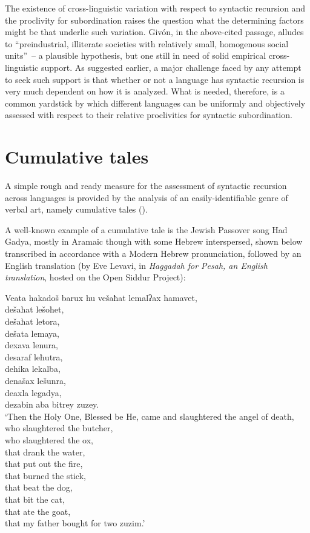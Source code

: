 \documentclass[output=paper]{langscibook}
\begin{document}
The existence of cross-linguistic variation with respect to syntactic recursion and the proclivity for subordination raises the question what the determining factors might be that underlie such variation.  Givón, in the above-cited passage, alludes to ``preindustrial, illiterate societies with relatively small, homogenous social units''~– a plausible hypothesis, but one still in need of solid empirical cross-linguistic support.  As suggested earlier, a major challenge faced by any attempt to seek such support is that whether or not a language has syntactic recursion is very much dependent on how it is analyzed.  What is needed, therefore, is a common yardstick by which different languages can be uniformly and objectively assessed with respect to their relative proclivities for syntactic subordination.

\section{Cumulative tales}
A simple rough and ready measure for the assessment of syntactic recursion across languages is provided by the analysis of an easily-identifiable genre of verbal art, namely cumulative tales (\cites[230--234]{thompson1946folktale}[522--536]{aarne1961types}).

A well-known example of a cumulative tale is the Jewish Passover song Had Gadya, mostly in Aramaic though with some Hebrew interspersed, shown below transcribed in accordance with a Modern Hebrew pronunciation, followed by an English translation (by Eve Levavi, in \textit{Haggadah for Pesah, an English translation}, hosted on the Open Siddur Project):

\ea \label{ex:gil:10}

Veata hakadoš barux hu vešaħat lemalʔax hamavet,\\	
 dešaħat lešoħet,\\
 dešaħat letora,\\
 dešata lemaya,\\
 dexava lenura,\\
 desaraf leħutra,\\
 dehika lekalba,\\
 denašax lešunra,\\
 deaxla legadya,\\
 dezabin aba bitrey zuzey.\\

 `Then the Holy One, Blessed be He, came and slaughtered the angel of death,\\
 who slaughtered the butcher,\\
 who slaughtered the ox, \\
 that drank the water, \\
 that put out the fire, \\
 that burned the stick, \\
 that beat the dog, \\
 that bit the cat, \\
 that ate the goat, \\
 that my father bought for two zuzim.'
\end{document}
